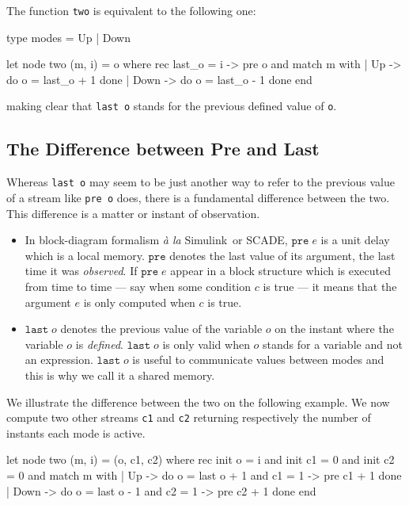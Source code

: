 \documentclass[11pt,titlepage,twoside]{report}
\newcommand{\simulink}{{\sf Simulink}}
\newcommand{\scade}{{\sf SCADE}}
\begin{document}
\medskip\noindent
The function \texttt{two} is equivalent to the following one:
\begin{runverbatim}[hide,label=updownmodes]
type modes = Up | Down
\end{runverbatim}
\begin{runverbatim}[continue]
let node two (m, i) = o where
  rec last_o = i -> pre o
  and match m with
      | Up -> do o = last_o + 1 done
      | Down -> do o = last_o - 1 done
      end
\end{runverbatim}
making clear that \verb-last o- stands for the previous defined value
of \verb-o-.

\subsection{The Difference between Pre and Last}
Whereas \verb-last o- may seem
to be just another way to refer to the previous value of a stream like
\verb-pre o- does, there is a fundamental difference between the
two. This difference is a matter or instant of observation.

\begin{itemize}
\item
In block-diagram formalism {\em \`a la}
\simulink\ or \scade, $\texttt{pre}\;e$ is a unit delay which
is a local memory. $\texttt{pre}$ denotes the last value of its argument, the
last time it was {\em observed}. If $\texttt{pre}\;e$ appear in a
block structure which is executed from time to time --- say when some condition
$c$ is true --- it means that the argument $e$ is only computed when
$c$ is true.
\item
$\texttt{last}\;o$ denotes the previous value of the variable $o$ on
  the instant where the variable $o$ is {\em defined}.
  $\texttt{last}\;o$ is only valid when $o$ stands for a variable and
  not an expression.  $\texttt{last}\;o$ is useful to communicate
  values between modes and this is why we call it a shared memory.
\end{itemize}

We illustrate the difference between the two on the following
example. We now compute two other streams \verb-c1- and \verb-c2-
returning respectively the number of instants each mode is active.
\begin{runverbatim}[include=updownmodes]
let node two (m, i) = (o, c1, c2) where
  rec init o = i
  and init c1 = 0
  and init c2 = 0
  and match m with
       | Up -> do o = last o + 1
              and c1 = 1 -> pre c1 + 1
              done
       | Down -> do o = last o - 1
                 and c2 = 1 -> pre c2 + 1
                 done
    end
\end{runverbatim}
\end{document}
